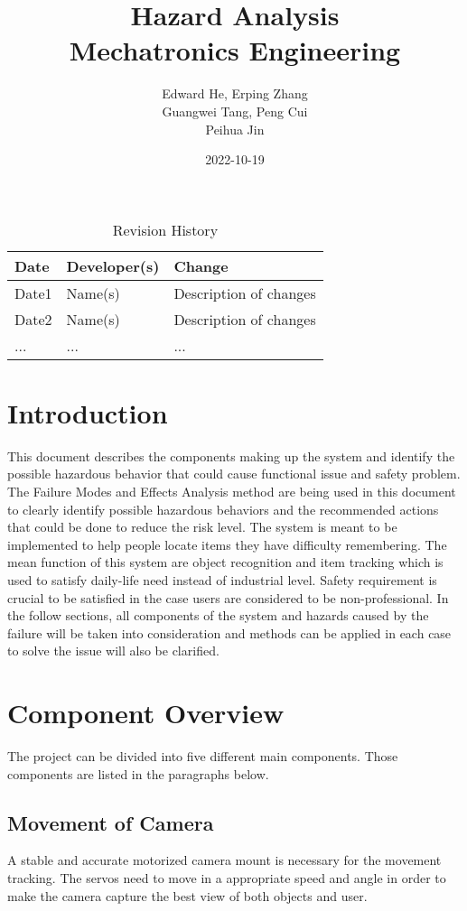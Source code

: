 \documentclass{article}
\title{Hazard Analysis\\Mechatronics Engineering}
\author{Edward He, Erping Zhang \\
Guangwei Tang, Peng Cui  \\
Peihua Jin  \\}
\date{2022-10-19}
\begin{document}
\begin{table}[hp]
\caption{Revision History} \label{TblRevisionHistory}
\begin{tabularx}{\textwidth}{llX}
\toprule
\textbf{Date} & \textbf{Developer(s)} & \textbf{Change}\\
\midrule
Date1 & Name(s) & Description of changes\\
Date2 & Name(s) & Description of changes\\
... & ... & ...\\
\bottomrule
\end{tabularx}
\end{table}

\newpage

\maketitle

\newpage


\tableofcontents

\newpage
\section{Introduction}
This document describes the components making up the system and identify the possible hazardous behavior that could cause functional issue and safety problem. The Failure Modes and Effects Analysis method are being used in this document to clearly identify possible hazardous behaviors and the recommended actions that could be done to reduce the risk level. The system is meant to be implemented to help people locate items they have difficulty remembering. The mean function of this system are object recognition and item tracking which is used to satisfy daily-life need instead of industrial level. Safety requirement is crucial to be satisfied in the case users are considered to be non-professional. In the follow sections, all components of the system and hazards caused by the failure will be taken into consideration and methods can be applied in each case to solve the issue will also be clarified.
\section{Component Overview}
The project can be divided into five different main components. Those components are listed in the paragraphs below.
\subsection{Movement of Camera}
A stable and accurate motorized camera mount is necessary for the movement tracking. The servos need to move in a appropriate speed and angle in order to make the camera capture the best view of both objects and user.
\end{document}
